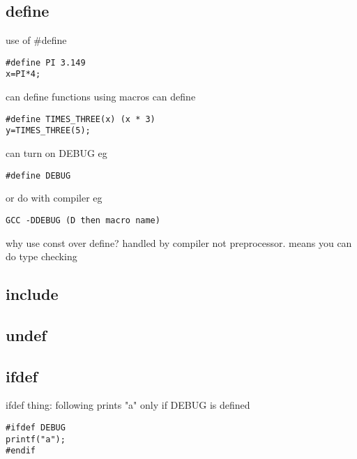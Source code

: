 

\subsection{define}

use of \#define

\begin{verbatim}
#define PI 3.149
x=PI*4;
\end{verbatim}

can define functions using macros
can define
\begin{verbatim}
#define TIMES_THREE(x) (x * 3)
y=TIMES_THREE(5);
\end{verbatim}

can turn on DEBUG eg
\begin{verbatim}
#define DEBUG
\end{verbatim}


or do with compiler eg

\begin{verbatim}
GCC -DDEBUG (D then macro name)
\end{verbatim}

why use const over define? handled by compiler not preprocessor. means you can do type checking

\subsection{include}

\subsection{undef}

\subsection{ifdef}

ifdef thing:
following prints "a" only if DEBUG is defined
\begin{verbatim}
#ifdef DEBUG
printf("a");
#endif
\end{verbatim}


